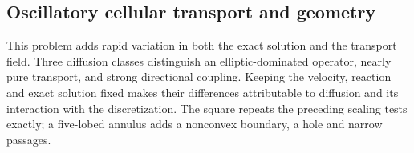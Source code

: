 \providecommand{\ADRResultsPath}{docs/research/solver_studies/adr_scaling_2026_09_17}
\providecommand{\ADRResultsFigurePath}{run_outputs/solver_studies/adr_scaling_2026_09_17/figures}
\providecommand{\ADROscPath}{\ADRResultsPath/oscillatory}
\subsection{Oscillatory cellular transport and geometry}
\label{sec:adr-oscillatory-scaling}

This problem adds rapid variation in both the exact solution and the
transport field. Three diffusion classes distinguish an elliptic-dominated
operator, nearly pure transport, and strong directional coupling. Keeping the
velocity, reaction and exact solution fixed makes their differences attributable
to diffusion and its interaction with the discretization. The square repeats
the preceding scaling tests exactly; a five-lobed annulus adds a nonconvex
boundary, a hole and narrow passages.

